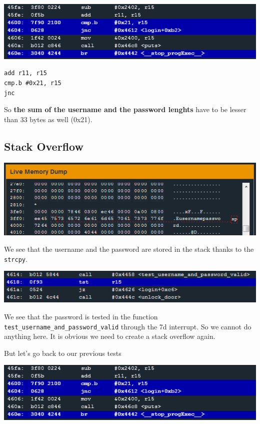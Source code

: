 \documentclass[a4paper,11pt]{article}
\begin{document}
\includegraphics{img/11_2.PNG}

\begin{verbatim}
add r11, r15
cmp.b #0x21, r15
jnc
\end{verbatim}

So \textbf{the sum of the username and the password lenghts} have to be
lesser than 33 bytes as well (0x21).

\subsection{Stack Overflow}\label{stack-overflow-1}

\includegraphics{img/11_3.PNG}

We see that the username and the password are stored in the stack thanks
to the \texttt{strcpy}.

\includegraphics{img/11_4.PNG}

We see that the password is tested in the function
\texttt{test\_username\_and\_password\_valid} through the 7d interrupt.
So we cannot do anything here. It is obvious we need to create a stack
overflow again.

But let's go back to our previous tests

\includegraphics{img/11_2.PNG}
\end{document}
